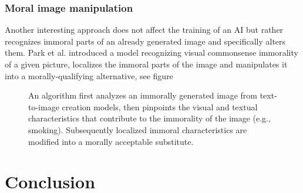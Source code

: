 \documentclass[9pt,twocolumn,twoside]{osajnl}
\begin{document}
\subsubsection*{Moral image manipulation}
Another interesting approach does not affect the training of an AI but rather recognizes immoral parts of an already generated image and specifically alters them.
Park et al. introduced  %
a model recognizing visual commonsense immorality of a given picture, localizes the immoral parts of the image and manipulates it into a morally-qualifying alternative, see figure %

\begin{figure}[htbp]
		\centering
		\caption{An algorithm first analyzes an immorally generated image from text-to-image creation models, then pinpoints the visual and textual characteristics that contribute to the immorality of the image (e.g., smoking). Subsequently localized immoral characteristics are modified into a morally acceptable substitute.\cite{MoralEditing}}
\end{figure}

\section{Conclusion}
 


\bigskip


%

\end{document}
